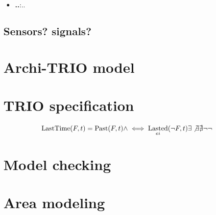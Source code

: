 \documentclass[a4paper]{article}
\newcommand{\liff}{\iff}
\DeclareMathOperator{\past}{Past}
\DeclareMathOperator{\lastedOp}{Lasted}
\newcommand{\lasted}{\lastedOp_{ei}}
\DeclareMathOperator{\lasttime}{LastTime}
\begin{document}
\begin{itemize}
	\item \textbf{..}:\@ ..
\end{itemize}

\subsection{Sensors? signals?}
\clearpage
\section{Archi-TRIO model}




\clearpage
\section{TRIO specification}
\begin{equation*}
\lasttime(F, t) = \past(F, t) \land \liff \lasted(\lnot F, t)
\exists 
\not\exists
\nexists
\neg
\lnot
\end{equation*}

\section{Model checking}

\pagebreak
\appendix
\section{Area modeling}
\end{document}
